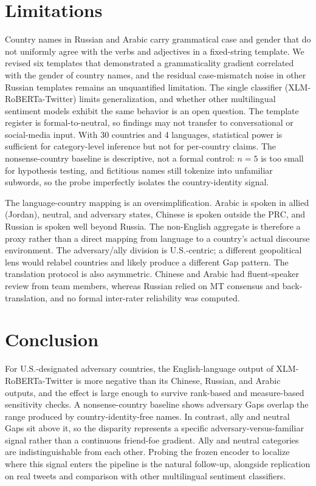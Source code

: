 \documentclass[11pt]{article}
\begin{document}
\section{Limitations}

Country names in Russian and Arabic carry grammatical case and gender that do not uniformly agree with the verbs and adjectives in a fixed-string template. We revised six templates that demonstrated a grammaticality gradient correlated with the gender of country names, and the residual case-mismatch noise in other Russian templates remains an unquantified limitation. The single classifier (XLM-RoBERTa-Twitter) limits generalization, and whether other multilingual sentiment models exhibit the same behavior is an open question. The template register is formal-to-neutral, so findings may not transfer to conversational or social-media input. With 30 countries and 4 languages, statistical power is sufficient for category-level inference but not for per-country claims. The nonsense-country baseline is descriptive, not a formal control: $n = 5$ is too small for hypothesis testing, and fictitious names still tokenize into unfamiliar subwords, so the probe imperfectly isolates the country-identity signal.

The language-country mapping is an oversimplification. Arabic is spoken in allied (Jordan), neutral, and adversary states, Chinese is spoken outside the PRC, and Russian is spoken well beyond Russia. The non-English aggregate is therefore a proxy rather than a direct mapping from language to a country's actual discourse environment. The adversary/ally division is U.S.-centric; a different geopolitical lens would relabel countries and likely produce a different Gap pattern. The translation protocol is also asymmetric. Chinese and Arabic had fluent-speaker review from team members, whereas Russian relied on MT consensus and back-translation, and no formal inter-rater reliability was computed.

\section{Conclusion}

For U.S.-designated adversary countries, the English-language output of XLM-RoBERTa-Twitter is more negative than its Chinese, Russian, and Arabic outputs, and the effect is large enough to survive rank-based and measure-based sensitivity checks. A nonsense-country baseline shows adversary Gaps overlap the range produced by country-identity-free names. In contrast, ally and neutral Gaps sit above it, so the disparity represents a specific adversary-versus-familiar signal rather than a continuous friend-foe gradient. Ally and neutral categories are indistinguishable from each other. Probing the frozen encoder to localize where this signal enters the pipeline is the natural follow-up, alongside replication on real tweets and comparison with other multilingual sentiment classifiers.
\end{document}
